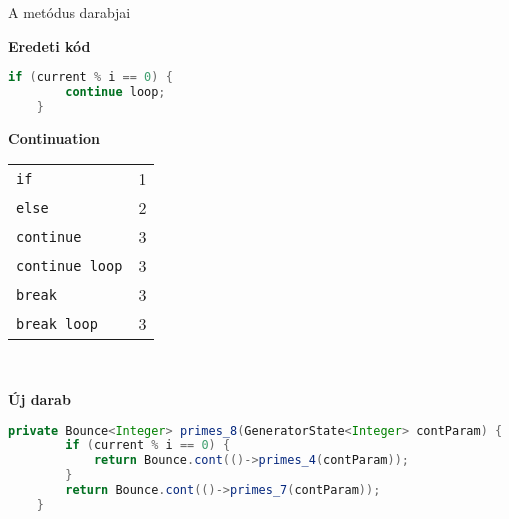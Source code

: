 \begin{frame}[t, fragile]{A metódus darabjai}
\noindent
\begin{minipage}[t][0.4\textheight][t]{\textwidth}
    \noindent
    \begin{minipage}{.50\textwidth}
    \noindent
    \begin{center}\textbf{Eredeti kód}\end{center}
    \begin{lstlisting}[language=java, basicstyle=\scriptsize]
    if (current % i == 0) {
        continue loop;
    }
    \end{lstlisting}
    \end{minipage}\hfill
    \begin{minipage}{.50\textwidth}
    \begin{center}\textbf{Continuation}\end{center}
    \begin{center}
        \begin{tabular}{l | c}
            \texttt{if} & 1 \\
            \texttt{else} & 2 \\
            \texttt{continue} & 3 \\
            \texttt{continue loop} & 3 \\
            \texttt{break} & 3 \\
            \texttt{break loop} & 3
        \end{tabular}
    \end{center}
    \end{minipage}
\end{minipage} \\
\begin{minipage}[b][0.6\textheight][t]{\textwidth}
    \begin{center}\textbf{Új darab}\end{center}
    \begin{lstlisting}[language=java, basicstyle=\scriptsize]
    private Bounce<Integer> primes_8(GeneratorState<Integer> contParam) {
        if (current % i == 0) {
            return Bounce.cont(()->primes_4(contParam));
        }
        return Bounce.cont(()->primes_7(contParam));
    }
    \end{lstlisting}
\end{minipage}
\end{frame}
